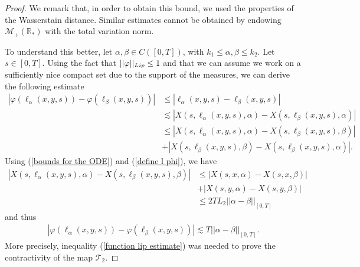 \documentclass[11pt]{article}
\numberwithin{equation}{section}
\theoremstyle{plain}
\begin{document}
\begin{proof}
 We remark that, in order to obtain this bound, we used the properties of the Wasserstain distance. Similar estimates cannot be obtained by endowing $\mathcal M_+(\mathbb R_*)$ with the total variation norm. 
 
To understand this better, let $\alpha,\beta\in C([0,T])$, with $k_{1}\leq \alpha,\beta\leq k_{2}$. Let $s\in[0,T]$. Using the fact that $||\varphi||_{\textup{Lip}}\leq 1$ and that we can assume we work on a sufficiently nice compact set due to the support of the measures, we can derive the following estimate
\begin{align*}
|\varphi(\ell_\alpha(x,y,s))-\varphi(\ell_\beta(x,y,s))|&\leq |\ell_\alpha(x,y,s)-\ell_\beta(x,y,s)|\\
&\lesssim  |X(s,\ell_\alpha(x,y,s),\alpha)-X(s,\ell_\beta(x,y,s),\alpha)|\\
&\leq|X(s,\ell_\alpha(x,y,s),\alpha)-X(s,\ell_\beta(x,y,s),\beta)|\\
&+|X(s,\ell_\beta(x,y,s),\beta)-X(s,\ell_\beta(x,y,s),\alpha)|.
\end{align*}
Using (\ref{bounds for the ODE}) and (\ref{define l phi}), we have
\begin{align*}
  |X(s,\ell_\alpha(x,y,s),\alpha)-X(s,\ell_\beta(x,y,s),\beta)|&   \leq  |X(s,x,\alpha)-X(s,x,\beta)|\\
  &+ |X(s,y,\alpha)-X(s,y,\beta)|\\
 &\leq 2TL_{2}||\alpha-\beta||_{[0,T]}
\end{align*}
and thus
\begin{align}\label{function lip estimate}
|\varphi(\ell_\alpha(x,y,s))-\varphi(\ell_\beta(x,y,s))|\lesssim  T ||\alpha-\beta||_{[0,T]}.
\end{align}
More precisely, inequality (\ref{function lip estimate}) was needed to prove the contractivity of the map $\mathcal{T}_{2}$.
 

\end{proof}
\end{document}
